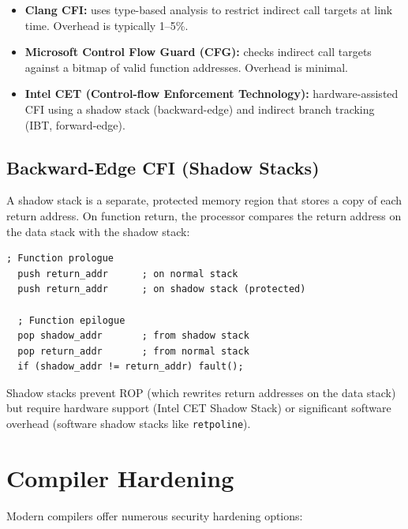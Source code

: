 \begin{itemize}
	\item \textbf{Clang CFI:} uses type-based analysis to restrict indirect call targets at link time. Overhead is typically 1--5\%.
	\item \textbf{Microsoft Control Flow Guard (CFG):} checks indirect call targets against a bitmap of valid function addresses. Overhead is minimal.
	\item \textbf{Intel CET (Control-flow Enforcement Technology):} hardware-assisted CFI using a shadow stack (backward-edge) and indirect branch tracking (IBT, forward-edge).
\end{itemize}

\subsection{Backward-Edge CFI (Shadow Stacks)}

A shadow stack is a separate, protected memory region that stores a copy of each return address. On function return, the processor compares the return address on the data stack with the shadow stack:

\begin{lstlisting}[caption=Shadow stack concept]
  ; Function prologue
  push return_addr      ; on normal stack
  push return_addr      ; on shadow stack (protected)

  ; Function epilogue
  pop shadow_addr       ; from shadow stack
  pop return_addr       ; from normal stack
  if (shadow_addr != return_addr) fault();
\end{lstlisting}

Shadow stacks prevent ROP (which rewrites return addresses on the data stack) but require hardware support (Intel CET Shadow Stack) or significant software overhead (software shadow stacks like \texttt{retpoline}).

\section{Compiler Hardening}

Modern compilers offer numerous security hardening options:


